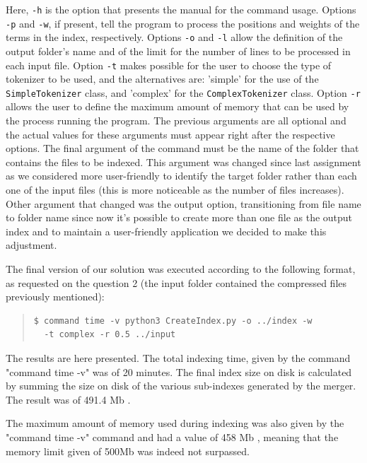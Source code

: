 \documentclass[12pt]{article}
\begin{document}
Here, \texttt{-h} is the option that presents the manual for the command usage.
Options \texttt{-p} and \texttt{-w}, if present, tell the program to process the
positions and weights of the terms in the index, respectively.
Options \texttt{-o} and \texttt{-l} allow the definition of the output folder's 
name and of the limit for the number of lines to be processed in each input file.
Option \texttt{-t} makes possible for the user to choose the type of tokenizer
to be used, and the alternatives are: 'simple' for the use of the 
\texttt{SimpleTokenizer} class, and 'complex' for the \texttt{ComplexTokenizer} class.
Option \texttt{-r} allows the user to define the maximum amount of memory that can
be used by the process running the program.
The previous arguments are all optional and the actual values for these arguments
must appear right after the respective options.
The final argument of the command must be the name of the folder that contains the
files to be indexed. This argument was changed since last assignment as we considered
more user-friendly to identify the target folder rather than each one of the input files
(this is more noticeable as the number of files increases). Other argument that changed
was the output option, transitioning from file name to folder name since now it's possible
to create more than one file as the output index and to maintain a user-friendly application we decided
to make this adjustment.

The final version of our solution was executed according to the following format,
as requested on the question 2 (the input folder contained the compressed
files previously mentioned):

\begingroup
\addtolength\leftmargini{-0.4in}
\addtolength\baselineskip{-0.05in}
\begin{quote}
\begin{verbatim}
$ command time -v python3 CreateIndex.py -o ../index -w 
  -t complex -r 0.5 ../input
\end{verbatim}
\end{quote}
\endgroup

The results are here presented. The total indexing time, given by the command
"command time -v" was of 20 minutes.
The final index size on disk is calculated by summing the size on disk of the 
various sub-indexes generated by the merger. 
The result was of 491.4 Mb .

The maximum amount of memory used during indexing was also given by the 
"command time -v" command and had a value of 458 Mb , meaning that
the memory limit given of 500Mb was indeed not surpassed.
\end{document}
